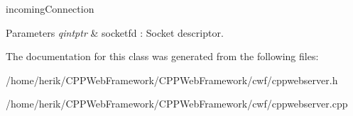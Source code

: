 incoming\+Connection 


\begin{DoxyParams}{Parameters}
{\em qintptr} & socketfd \+: Socket descriptor. \\
\hline
\end{DoxyParams}


The documentation for this class was generated from the following files\+:\begin{DoxyCompactItemize}
\item 
/home/herik/\+C\+P\+P\+Web\+Framework/\+C\+P\+P\+Web\+Framework/cwf/cppwebserver.\+h\item 
/home/herik/\+C\+P\+P\+Web\+Framework/\+C\+P\+P\+Web\+Framework/cwf/cppwebserver.\+cpp\end{DoxyCompactItemize}
